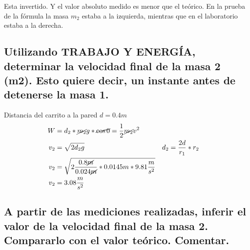 \documentclass[12pt]{article}
\begin{document}
Esta invertido.
Y el valor absoluto medido es menor que el teórico.
En la prueba de la fórmula la masa $m_2$ estaba a la izquierda, mientras que en el laboratorio estaba a la derecha.

\subsection{Utilizando  TRABAJO  Y  ENERGÍA,
determinar  la  velocidad  final  de  la  masa  2 (m2).
Esto quiere decir, un instante antes de detenerse la masa 1.}%

Distancia del carrito a la pared $d=0.4m$
\begin{align*}
	W &= d_2*\cancel{m_2}g*\cancel{\cos{0}} = \frac{1}{2} \cancel{m_2}v^2\\
	v_2 &= \sqrt{2d_2g} && d_2 =\frac{2d}{r_1}*r_2\\
	v_2 &= \sqrt{2\frac{0.8\cancel{m}}{0.024\cancel{m}}*0.0145m*9.81 \frac{m}{s^2} }\\
	v_2 &= 3.08\frac{m}{s^2}
\end{align*}

\subsection{A partir de las mediciones realizadas,
inferir el valor de la velocidad final de la masa 2.
Compararlo con el valor teórico.
Comentar.}%
\end{document}
